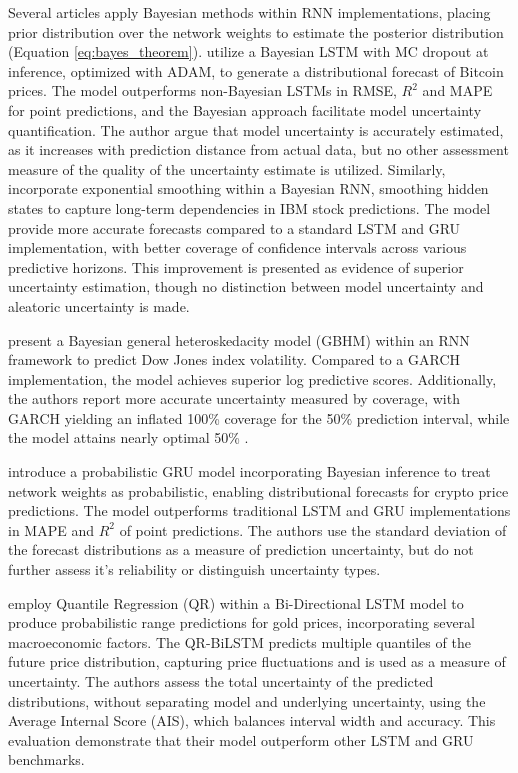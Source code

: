 Several articles apply Bayesian methods within RNN implementations, placing prior distribution over the network weights to estimate the posterior distribution (Equation \ref{eq:bayes_theorem}). \textcite{Hassan2024Bitcoin} utilize a Bayesian LSTM with MC dropout at inference, optimized with ADAM, to generate a distributional forecast of Bitcoin prices. The model outperforms non-Bayesian LSTMs in RMSE, $R^2$ and MAPE for point predictions, and the Bayesian approach facilitate model uncertainty quantification. The author argue that model uncertainty is accurately estimated, as it increases with prediction distance from actual data, but no other assessment measure of the quality of the uncertainty estimate is utilized. Similarly, \textcite{Dixon2022Industrial} incorporate exponential smoothing within a Bayesian RNN, smoothing hidden states to capture long-term dependencies in IBM stock predictions. The model provide more accurate forecasts compared to a standard LSTM and GRU implementation, with better coverage of confidence intervals across various predictive horizons. This improvement is presented as evidence of superior uncertainty estimation, though no distinction between model uncertainty and aleatoric uncertainty is made.

\textcite{Parker2021BayesianHeteroskedastic} present a Bayesian general heteroskedacity model (GBHM) within an RNN framework to predict Dow Jones index volatility. Compared to a GARCH implementation, the model achieves superior log predictive scores. Additionally, the authors report more accurate uncertainty measured by coverage, with GARCH yielding an inflated 100\% coverage for the 50\% prediction interval, while the model attains nearly optimal 50\% .

\textcite{Golnari2024Cryptocurrency} introduce a probabilistic GRU model incorporating Bayesian inference to treat network weights as probabilistic, enabling distributional forecasts
 for crypto price predictions. The model outperforms traditional LSTM and GRU implementations in MAPE and $R^2$ of point predictions. The authors use the standard deviation of the forecast distributions as a measure of prediction uncertainty, but do not further assess it's reliability or distinguish uncertainty types.  

\textcite{Wang2024GoldForecasting} employ Quantile Regression (QR) within a Bi-Directional LSTM model to produce probabilistic range predictions for gold prices, incorporating several macroeconomic factors. The QR-BiLSTM predicts multiple quantiles of the future price distribution, capturing price fluctuations and is used as a measure of uncertainty. The authors assess the total uncertainty of the predicted distributions, without separating model and underlying uncertainty, using the Average Internal Score (AIS), which balances interval width and accuracy. This evaluation demonstrate that their model outperform other LSTM and GRU benchmarks. 

